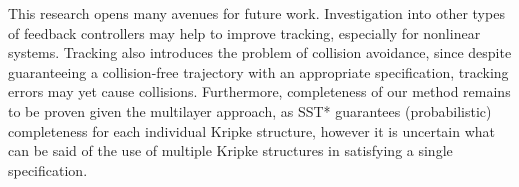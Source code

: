 This research opens many avenues for future work. Investigation into other types of feedback controllers may help to improve tracking, especially for nonlinear systems. Tracking also introduces the problem of collision avoidance, since despite guaranteeing a collision-free trajectory with an appropriate \mucalc{} specification, tracking errors may yet cause collisions. Furthermore, completeness of our method remains to be proven given the multilayer approach, as SST* guarantees (probabilistic) completeness for each individual Kripke structure, however it is uncertain what can be said of the use of multiple Kripke structures in satisfying a single specification.
